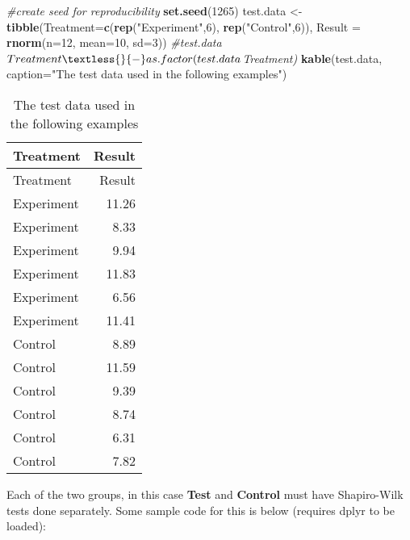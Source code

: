 \documentclass[
]{article}
\newenvironment{Shaded}{\begin{snugshade}}{\end{snugshade}}
\newcommand{\AttributeTok}[1]{\textcolor[rgb]{0.13,0.29,0.53}{#1}}
\newcommand{\CommentTok}[1]{\textcolor[rgb]{0.56,0.35,0.01}{\textit{#1}}}
\newcommand{\DecValTok}[1]{\textcolor[rgb]{0.00,0.00,0.81}{#1}}
\newcommand{\FunctionTok}[1]{\textcolor[rgb]{0.13,0.29,0.53}{\textbf{#1}}}
\newcommand{\NormalTok}[1]{#1}
\newcommand{\OtherTok}[1]{\textcolor[rgb]{0.56,0.35,0.01}{#1}}
\newcommand{\StringTok}[1]{\textcolor[rgb]{0.31,0.60,0.02}{#1}}
\begin{document}
\begin{Shaded}
\begin{Highlighting}[]
\CommentTok{\#create seed for reproducibility}
\FunctionTok{set.seed}\NormalTok{(}\DecValTok{1265}\NormalTok{)}
\NormalTok{test.data }\OtherTok{\textless{}{-}} \FunctionTok{tibble}\NormalTok{(}\AttributeTok{Treatment=}\FunctionTok{c}\NormalTok{(}\FunctionTok{rep}\NormalTok{(}\StringTok{"Experiment"}\NormalTok{,}\DecValTok{6}\NormalTok{), }\FunctionTok{rep}\NormalTok{(}\StringTok{"Control"}\NormalTok{,}\DecValTok{6}\NormalTok{)),}
           \AttributeTok{Result =} \FunctionTok{rnorm}\NormalTok{(}\AttributeTok{n=}\DecValTok{12}\NormalTok{, }\AttributeTok{mean=}\DecValTok{10}\NormalTok{, }\AttributeTok{sd=}\DecValTok{3}\NormalTok{))}
\CommentTok{\#test.data$Treatment \textless{}{-} as.factor(test.data$Treatment)}
\FunctionTok{kable}\NormalTok{(test.data, }\AttributeTok{caption=}\StringTok{"The test data used in the following examples"}\NormalTok{)}
\end{Highlighting}
\end{Shaded}

\begin{longtable}[]{@{}lr@{}}
\caption{The test data used in the following examples}\tabularnewline
\toprule\noalign{}
Treatment & Result \\
\midrule\noalign{}
\endfirsthead
\toprule\noalign{}
Treatment & Result \\
\midrule\noalign{}
\endhead
\bottomrule\noalign{}
\endlastfoot
Experiment & 11.26 \\
Experiment & 8.33 \\
Experiment & 9.94 \\
Experiment & 11.83 \\
Experiment & 6.56 \\
Experiment & 11.41 \\
Control & 8.89 \\
Control & 11.59 \\
Control & 9.39 \\
Control & 8.74 \\
Control & 6.31 \\
Control & 7.82 \\
\end{longtable}

Each of the two groups, in this case \textbf{Test} and \textbf{Control}
must have Shapiro-Wilk tests done separately. Some sample code for this
is below (requires dplyr to be loaded):
\end{document}
